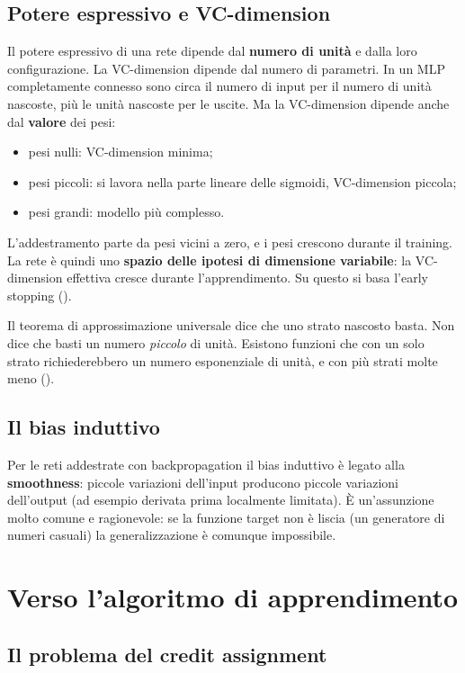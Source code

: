\subsection{Potere espressivo e VC-dimension}
\label{sec:vc-reti}

Il potere espressivo di una rete dipende dal \textbf{numero di unità} e dalla loro configurazione. La
VC-dimension dipende dal numero di parametri. In un MLP completamente connesso sono circa il numero di input per
il numero di unità nascoste, più le unità nascoste per le uscite. Ma la VC-dimension dipende anche dal
\textbf{valore} dei pesi:
\begin{itemize}
  \item pesi nulli: VC-dimension minima;
  \item pesi piccoli: si lavora nella parte lineare delle sigmoidi, VC-dimension piccola;
  \item pesi grandi: modello più complesso.
\end{itemize}
L'addestramento parte da pesi vicini a zero, e i pesi crescono durante il training. La rete è quindi uno
\textbf{spazio delle ipotesi di dimensione variabile}: la VC-dimension effettiva cresce durante l'apprendimento.
Su questo si basa l'early stopping ().

Il teorema di approssimazione universale dice che uno strato nascosto basta. Non dice che basti un numero
\emph{piccolo} di unità. Esistono funzioni che con un solo strato richiederebbero un numero esponenziale di unità,
e con più strati molte meno ().

\subsection{Il bias induttivo}

Per le reti addestrate con backpropagation il bias induttivo è legato alla \textbf{smoothness}: piccole variazioni
dell'input producono piccole variazioni dell'output (ad esempio derivata prima localmente limitata). È
un'assunzione molto comune e ragionevole: se la funzione target non è liscia (un generatore di numeri casuali) la
generalizzazione è comunque impossibile.

\section{Verso l'algoritmo di apprendimento}
\label{sec:credit-assignment}

\subsection{Il problema del credit assignment}

